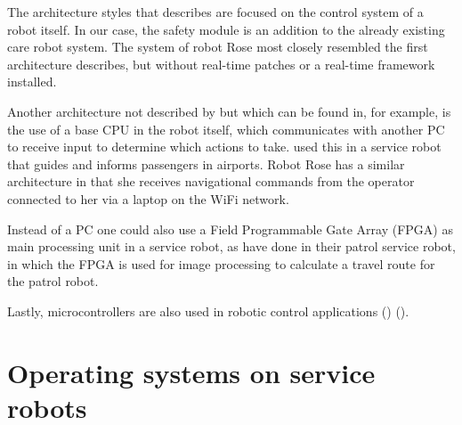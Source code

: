 \documentclass[12pt]{scrreprt}
\begin{document}
\par
The architecture styles that \citeauthor{bouchier} describes are focused on the control system of a robot itself. In our case, the safety module is an addition to the already existing care robot system. The system of robot Rose most closely resembled the first architecture \citeauthor{bouchier} describes, but without real-time patches or a real-time framework installed. %
\par
Another architecture not described by \citeauthor{bouchier} but which can be found in, for example, \cite{spencer} is the use of a base CPU in the robot itself, which communicates with another PC to receive input to determine which actions to take. \citeauthor{spencer} used this in a service robot that guides and informs passengers in airports. Robot Rose has a similar architecture in that she receives navigational commands from the operator connected to her via a laptop on the WiFi network. 
\par
Instead of a PC one could also use a Field Programmable Gate Array (FPGA) as main processing unit in a service robot, as \citeauthor{visual_xenomai} have done in their patrol service robot, in which the FPGA is used for image processing to calculate a travel route for the patrol robot. 
\par
Lastly, microcontrollers are also used in robotic control applications (\cite{microcontroller1}) (\cite{microcontroller2}).

\section{Operating systems on service robots}
\label{tOS}
\end{document}
